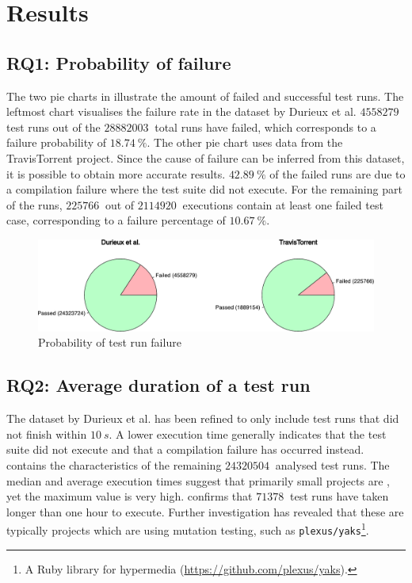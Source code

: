 
\section{Results}

\subsection{RQ1: Probability of failure}\label{ssec:results-rq1}
The two pie charts in  illustrate the amount of failed and successful test runs. The leftmost chart visualises the failure rate in the dataset \cite{travisanalysis} by Durieux et al. $\SI{4558279}{}$ test runs out of the $\SI{28882003}{}$ total runs have failed, which corresponds to a failure probability of $\SI{18.74}{\percent}$. The other pie chart uses data from the TravisTorrent \cite{msr17challenge} project. Since the cause of failure can be inferred from this dataset, it is possible to obtain more accurate results. $\SI{42.89}{\percent}$ of the failed runs are due to a compilation failure where the test suite did not execute. For the remaining part of the runs, $\SI{225766}{}$ out of $\SI{2114920}{}$ executions contain at least one failed test case, corresponding to a failure percentage of $\SI{10.67}{\percent}$.

\begin{figure}[htbp!]
	\centering
	\includegraphics[width=\textwidth]{assets/charts/rq1-failure-probability.pdf}
	\caption{Probability of test run failure}
	\label{fig:rq1-failure-probability}
\end{figure}

\subsection{RQ2: Average duration of a test run}
The dataset by Durieux et al. \cite{travisanalysis} has been refined to only include test runs that did not finish within $\SI{10}{s}$. A lower execution time generally indicates that the test suite did not execute and that a compilation failure has occurred instead.  contains the characteristics of the remaining $\SI{24320504}{}$ analysed test runs. The median and average execution times suggest that primarily small projects are \travisci{}, yet the maximum value is very high.  confirms that $\SI{71378}{}$ test runs have taken longer than one hour to execute. Further investigation has revealed that these are typically projects which are using mutation testing, such as \texttt{plexus/yaks}\footnote{A Ruby library for hypermedia (\url{https://github.com/plexus/yaks}).}.

